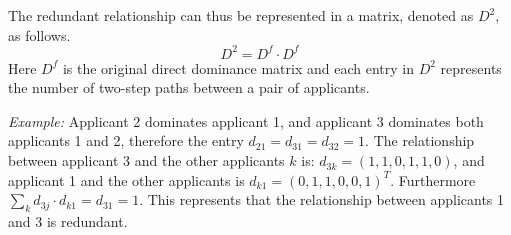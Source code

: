 \documentclass[12pt,english]{report}
\begin{document}
The redundant relationship can thus be represented in a matrix, denoted as $D^2$,  as follows. $$D^2 = D^{f} \cdot D^{f} $$  Here $D^f$ is the original direct dominance matrix and  each entry in $D^2$ represents the number of two-step paths between a pair of applicants.
 
\noindent \textit{Example:} Applicant 2 dominates applicant 1, and applicant 3 dominates both applicants 1 and 2, therefore the entry $d_{21}=d_{31}=d_{32}=1$. The relationship between applicant 3 and the other applicants $k$ is: $d_{3k}=(1,1,0,1,1,0)$, and applicant 1 and the other applicants is $d_{k1}=(0,1,1,0,0,1) ^T $. Furthermore $\sum_k d_{3j} \cdot d_{k1}=d_{31}=1$. This represents that the relationship between applicants 1 and 3 is redundant.


\begin{figure}
\begin{floatrow}
\capbtabbox{%
    \begin{tabular}{l|llllll}
        & 1 & 2 & 3 & 4 & 5 & 6 \\ \hline
        1 & 0 & 0 & 0 & 0 & 0 & 0 \\
        2 & 0 & 0 & 0 & 0 & 0 & 0 \\
        3 & 1 & 0 & 0 & 1 & 1 & 0 \\
        4 & 0 & 0 & 0 & 0 & 0 & 0 \\
        5 & 0 & 0 & 0 & 0 & 0 & 0 \\
        6 & 1 & 1 & 0 & 1 & 1 & 0 \\
    \end{tabular}
    \label{domin_matrix2}%
}{%
\caption{Redundant dominance relationships in matrix}%
\label{redundant1}
}
\end{floatrow}
\end{figure}
\end{document}

